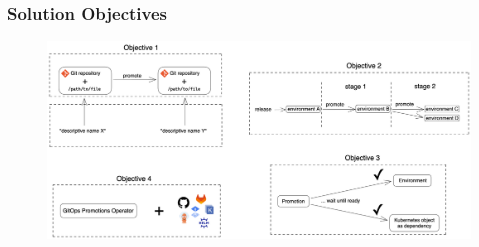 \documentclass{beamer}
\begin{document}
\begin{frame}
	\frametitle{Solution Objectives}
	\begin{figure}[h]
	\centering
	\includegraphics[width=1.0\linewidth]{assets/objectives-visualized-one-page.png}
\end{figure}
\end{frame}




\end{document}
